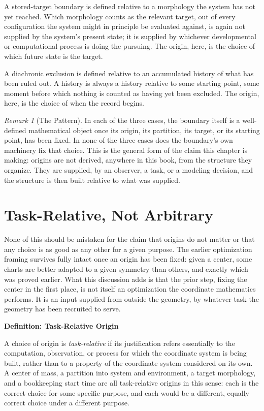 \documentclass[11pt,fleqn]{book}
\numberwithin{equation}{chapter}
\newenvironment{definition}[1]
  {\begin{definitionEnv}
   \noindent\textbf{Definition: #1}\par\smallskip}
  {\end{definitionEnv}}
\theoremstyle{plain}
\theoremstyle{definition}
\theoremstyle{remark}
\newtheorem{remark}[theorem]{Remark}
\begin{document}
A stored-target boundary is defined relative to a morphology the system has not yet reached. Which morphology counts as the relevant target, out of every configuration the system might in principle be evaluated against, is again not supplied by the system's present state; it is supplied by whichever developmental or computational process is doing the pursuing. The origin, here, is the choice of which future state is the target.

A diachronic exclusion is defined relative to an accumulated history of what has been ruled out. A history is always a history relative to some starting point, some moment before which nothing is counted as having yet been excluded. The origin, here, is the choice of when the record begins.

\begin{remark}[The Pattern]
In each of the three cases, the boundary itself is a well-defined mathematical object once its origin, its partition, its target, or its starting point, has been fixed. In none of the three cases does the boundary's own machinery fix that choice. This is the general form of the claim this chapter is making: origins are not derived, anywhere in this book, from the structure they organize. They are supplied, by an observer, a task, or a modeling decision, and the structure is then built relative to what was supplied.
\end{remark}

\section{Task-Relative, Not Arbitrary}

None of this should be mistaken for the claim that origins do not matter or that any choice is as good as any other for a given purpose. The earlier optimization framing survives fully intact once an origin has been fixed: given a center, some charts are better adapted to a given symmetry than others, and exactly which was proved earlier. What this discussion adds is that the prior step, fixing the center in the first place, is not itself an optimization the coordinate mathematics performs. It is an input supplied from outside the geometry, by whatever task the geometry has been recruited to serve.

\begin{definition}{Task-Relative Origin}
A choice of origin is \emph{task-relative} if its justification refers essentially to the computation, observation, or process for which the coordinate system is being built, rather than to a property of the coordinate system considered on its own. A center of mass, a partition into system and environment, a target morphology, and a bookkeeping start time are all task-relative origins in this sense: each is the correct choice for some specific purpose, and each would be a different, equally correct choice under a different purpose.
\end{definition}
\end{document}
